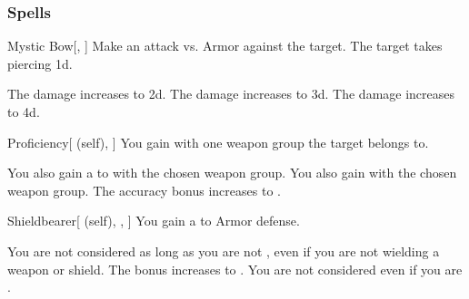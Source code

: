 \subsubsection{Spells}


\lowercase{\hypertarget{spell:Mystic Bow}{}}\label{spell:Mystic Bow}
\begin{freeability}[Rank 1]{\hypertarget{spell:Mystic Bow}{Mystic Bow}}[, ]
Make an attack vs. Armor against the target.
\hit The target takes piercing  \plus1d.

\rankline
{} The damage increases to  \plus2d.
 The damage increases to  \plus3d.
 The damage increases to  \plus4d.
\end{freeability}
\vspace{0.25em}



\lowercase{\hypertarget{spell:Proficiency}{}}\label{spell:Proficiency}
\begin{attuneability}[Rank 1]{\hypertarget{spell:Proficiency}{Proficiency}}[ (self), ]
You gain  with one weapon group the target belongs to.

\rankline
{} You also gain a   to  with the chosen weapon group.
 You also gain  with the chosen weapon group.
 The accuracy bonus increases to .
\end{attuneability}
\vspace{0.25em}



\lowercase{\hypertarget{spell:Shieldbearer}{}}\label{spell:Shieldbearer}
\begin{attuneability}[Rank 1]{\hypertarget{spell:Shieldbearer}{Shieldbearer}}[ (self), , ]
You gain a   to Armor defense.

\rankline
{} You are not considered  as long as you are not , even if you are not wielding a weapon or shield.
 The bonus increases to .
 You are not considered  even if you are .
\end{attuneability}
\vspace{0.25em}



